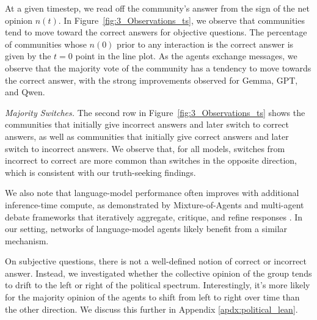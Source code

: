 At a given timestep, we read off the community's answer from the sign of the net opinion $n(t)$. In Figure~\ref{fig:3_Observations_ts}, we observe that communities tend to move toward the correct answers for objective questions. The percentage of communities whose $n(0)$ prior to any interaction is the correct answer is given by the $t=0$ point in the line plot. As the agents exchange messages, we observe that the majority vote of the community has a tendency to move towards the correct answer, with the strong improvements observed for Gemma, GPT, and Qwen.

\textit{Majority Switches.} The second row in Figure~\ref{fig:3_Observations_ts} shows the communities that initially give incorrect answers and later switch to correct answers, as well as communities that initially give correct answers and later switch to incorrect answers. We observe that, for all models, switches from incorrect to correct are more common than switches in the opposite direction, which is consistent with our truth-seeking findings.

We also note that language-model performance often improves with additional inference-time compute, as demonstrated by Mixture-of-Agents and multi-agent debate frameworks that iteratively aggregate, critique, and refine responses \citep{wang2024mixtureofagentsenhanceslargelanguage,du2023improvingfactualityreasoninglanguage,liang-etal-2024-encouraging}. In our setting, networks of language-model agents likely benefit from a similar mechanism. 


On subjective questions, there is not a well-defined notion of correct or incorrect answer. Instead, we investigated whether the collective opinion of the group tends to drift to the left or right of the political spectrum. Interestingly, it's more likely for the majority opinion of the agents to shift from left to right over time than the other direction. We discuss this further in Appendix \ref{apdx:political_lean}.

